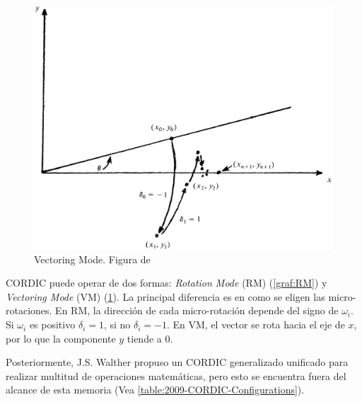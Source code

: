 \begin{figure}[ht]
	\centering
	\includegraphics[width=\textwidth]{archivos/CORDIC/VectoringMode.png}
	\caption{Vectoring Mode. Figura de \cite{schelin_calculator_1983}}
	\label{graf:VM}
\end{figure}

CORDIC puede operar de dos formas: \textit{Rotation Mode} (RM) (\ref{graf:RM}) y \textit{Vectoring Mode} (VM) (\ref{graf:VM}). La principal diferencia es en como se eligen las micro-rotaciones. En RM, la dirección de cada micro-rotación depende del signo de $\omega_{i}$. Si $\omega_{i}$ es positivo $\delta_{i} = 1$, si no $\delta_{i} = -1$. En VM, el vector se rota hacia el eje de $x$, por lo que la componente $y$ tiende a 0.

Posteriormente, J.S. Walther propuso un CORDIC generalizado unificado para realizar multitud de operaciones matemáticas, pero esto se encuentra fuera del alcance de esta memoria (Vea \ref{table:2009-CORDIC-Configurations}).

